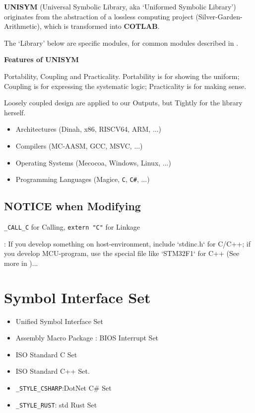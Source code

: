 

\textbf{UNISYM} (Universal Symbolic Library, aka `Uniformed Symbolic Library') originates from the abstraction of a lossless computing project (Silver-Garden-Arithmetic), which is transformed into \textbf{COTLAB}.

The `Library' below are specific modules, for common modules described in .

\textbf{Features of UNISYM}

Portability, Coupling and Practicality. Portability is for showing the uniform; Coupling is for expressing the systematic logic; Practicality is for making sense.

Loosely coupled design are applied to our Outputs, but Tightly for the library herself.

\begin{itemize}
\item Architectures (Dinah, x86, RISCV64, ARM, ...)
\item Compilers (MC-AASM, GCC, MSVC, ...)
\item Operating Systems (Mecocoa, Windows, Linux, ...)
\item Programming Languages (Magice, \verb|C|, \verb|C#|, ...)
\end{itemize}

\subsection{NOTICE when Modifying}

\verb`_CALL_C` for Calling, \verb`extern "C"` for Linkage


:
If you develop something on host-environment, include `stdinc.h` for C/C++;
if you develop MCU-program, use the special file like `STM32F1` for C++ (See more in )...

\section{Symbol Interface Set}

\begin{itemize}
\item Unified Symbol Interface Set
\item Assembly Macro Package : BIOS Interrupt Set
\item ISO Standard C Set
\item ISO Standard C++ Set.
\item \verb|_STYLE_CSHARP|:DotNet C# Set
\item \verb|_STYLE_RUST|: std Rust Set
\end{itemize}

